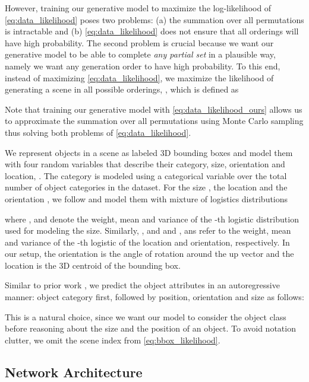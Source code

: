 \documentclass{article}
\newcommand{\boldparagraph}[1]{\vspace{0.2cm}\noindent{\bf #1:} }
\begin{document}
However, training our generative model to maximize the log-likelihood of
\eqref{eq:data_likelihood} poses two problems: (a) the summation over all
permutations is intractable and (b) \eqref{eq:data_likelihood} does not ensure
that all orderings will have high probability. The second problem is crucial
because we want our generative model to be able to complete \emph{any
partial set} in a plausible way, namely we want any generation order to have
high probability. To this end, instead of maximizing
\eqref{eq:data_likelihood}, we maximize the likelihood of generating a scene in
all possible orderings, , which is defined as

Note that training our generative model with \eqref{eq:data_likelihood_ours}
allows us to approximate the summation over all permutations using Monte Carlo
sampling thus solving both problems of \eqref{eq:data_likelihood}.

\boldparagraph{Modelling Object Attributes}We represent objects in a scene as labeled 3D bounding boxes and model them
with four random variables that describe their category, size, orientation and
location, . The category
 is modeled using a categorical variable over the total number of
object categories  in the dataset. For the size , the
location  and the orientation ,
we follow \cite{Salimans2017ICLR, Oord2016SSW} and model them with mixture
of logistics distributions

where ,  and  denote the
weight, mean and variance of the -th logistic distribution used for
modeling the size. Similarly, ,  and  and
,  ans  refer to the weight, mean and variance of
the -th logistic of the location and orientation, respectively. In our
setup, the orientation is the angle of rotation around the up vector and the
location is the 3D centroid of the bounding box.

Similar to prior work \cite{Ritchie2019CVPR, Wang2020ARXIV}, we predict the
object attributes in an autoregressive manner: object category first, followed
by position, orientation and size as follows:

This is a natural choice, since we want our model to consider the object class
before reasoning about the size and the position of an object. To avoid
notation clutter, we omit the scene index  from \eqref{eq:bbox_likelihood}.

\vspace{-2mm}
\subsection{Network Architecture}\label{subsec:network_architecture}
\end{document}
